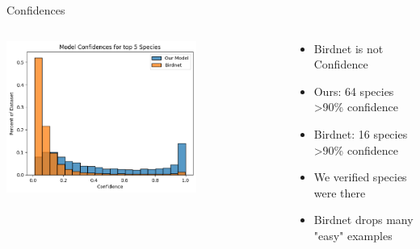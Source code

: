 \begin{frame}{Confidences}
    \begin{columns}
        \begin{column}{0.5\textwidth}
            \includegraphics[height=0.7\textheight,width=0.7\textwidth,keepaspectratio]{./images/conf.png}
        \end{column}
        \begin{column}{0.5\textwidth}
            \begin{itemize}
                \item Birdnet is not Confidence
                \item Ours: 64 species >90\% confidence
                \item Birdnet: 16 species >90\% confidence
                \item We verified species were there
                \item Birdnet drops many "easy" examples
            \end{itemize}
        \end{column}
    \end{columns}
\end{frame}

